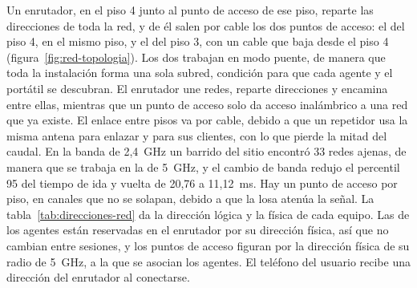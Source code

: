 Un enrutador, en el piso 4 junto al punto de acceso de ese piso, reparte las direcciones de toda la red, y de él salen por cable los dos puntos de acceso: el del piso 4, en el mismo piso, y el del piso 3, con un cable que baja desde el piso 4 (figura~\ref{fig:red-topologia}). Los dos trabajan en modo puente, de manera que toda la instalación forma una sola subred, condición para que cada agente y el portátil se descubran. El enrutador une redes, reparte direcciones y encamina entre ellas, mientras que un punto de acceso solo da acceso inalámbrico a una red que ya existe. El enlace entre pisos va por cable, debido a que un repetidor usa la misma antena para enlazar y para sus clientes, con lo que pierde la mitad del caudal. En la banda de 2,4~GHz un barrido del sitio encontró 33 redes ajenas, de manera que se trabaja en la de 5~GHz, y el cambio de banda redujo el percentil 95 del tiempo de ida y vuelta de 20,76 a 11,12~ms. Hay un punto de acceso por piso, en canales que no se solapan, debido a que la losa atenúa la señal. La tabla~\ref{tab:direcciones-red} da la dirección lógica y la física de cada equipo. Las de los agentes están reservadas en el enrutador por su dirección física, así que no cambian entre sesiones, y los puntos de acceso figuran por la dirección física de su radio de 5~GHz, a la que se asocian los agentes. El teléfono del usuario recibe una dirección del enrutador al conectarse.

